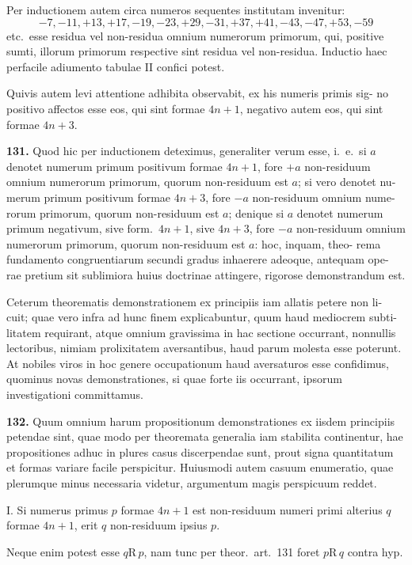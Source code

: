 \documentclass[12pt,a4paper]{article}
\newcommand{\R}{\mbox{R}}
\begin{document}
Per inductionem autem circa numeros sequentes institutam invenitur:
\[
-7, -11, +13, +17, -19, -23, +29, -31, +37, +41, -43, -47, +53, -59
\]
etc.\ esse residua vel non-residua omnium numerorum primorum, qui, positive
sumti, illorum primorum respective sint residua vel non-residua. Inductio haec
perfacile adiumento tabulae II confici potest.

Quivis autem levi attentione adhibita observabit, ex his numeris primis sig-
no positivo affectos esse eos, qui sint formae $4n+1$, negativo autem eos, qui
sint formae $4n+3$.

\textbf{131.}
Quod hic per inductionem deteximus, generaliter verum esse, i.~e.\ si
$a$ denotet numerum primum positivum formae $4n+1$, fore $+a$ non-residuum
omnium numerorum primorum, quorum non-residuum est $a$; si vero denotet nu-
merum primum positivum formae $4n+3$, fore $-a$ non-residuum omnium nume-
rorum primorum, quorum non-residuum est $a$; denique si $a$ denotet numerum
primum negativum, sive form.\ $4n+1$, sive $4n+3$, fore $-a$ non-residuum
omnium numerorum primorum, quorum non-residuum est $a$: hoc, inquam, theo-
rema fundamento congruentiarum secundi gradus inhaerere adeoque, antequam ope-
rae pretium sit sublimiora huius doctrinae attingere, rigorose demonstrandum est.

Ceterum theorematis demonstrationem ex principiis iam allatis petere non li-
cuit; quae vero infra ad hunc finem explicabuntur, quum haud mediocrem subti-
litatem requirant, atque omnium gravissima in hac sectione occurrant, nonnullis
lectoribus, nimiam prolixitatem aversantibus, haud parum molesta esse poterunt.
At nobiles viros in hoc genere occupationum haud aversaturos esse confidimus,
quominus novas demonstrationes, si quae forte iis occurrant, ipsorum investigationi
committamus.

\textbf{132.}
Quum omnium harum propositionum demonstrationes ex iisdem principiis
petendae sint, quae modo per theoremata generalia iam stabilita continentur, hae
propositiones adhuc in plures casus discerpendae sunt, prout signa quantitatum
et formas variare facile perspicitur. Huiusmodi autem casuum enumeratio, quae
plerumque minus necessaria videtur, argumentum magis perspicuum reddet.

I. Si numerus primus $p$ formae $4n+1$ est non-residuum numeri primi
alterius $q$ formae $4n+1$, erit $q$ non-residuum ipsius $p$.

Neque enim potest esse $q \R\, p$, nam tunc per theor.\ art.~131 foret $p \R\, q$
contra hyp.
\end{document}
